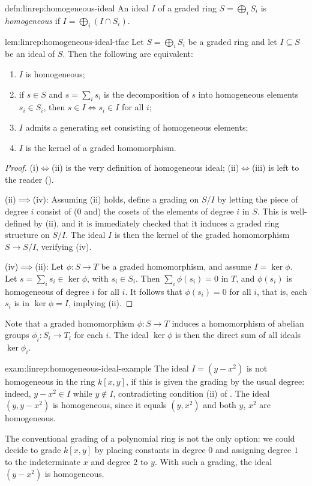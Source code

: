 \begin{defn}{}{defn:linrep:homogeneous-ideal}
  An ideal $I$ of a graded ring $S = \bigoplus_i S_i$ is
  \emph{homogeneous} if $I = \bigoplus_i (I \cap S_i)$.
\end{defn}
\begin{lem}{}{lem:linrep:homogeneous-ideal-tfae}
  Let $S = \bigoplus_i S_i$ be a graded ring and let $I \subseteq S$
  be an ideal of $S$. Then the following are equivalent:
  \begin{enumerate}[label=(\roman*)]
  \item $I$ is homogeneous;
  \item if $s \in S$ and $s = \sum_i s_i$ is the decomposition of $s$
    into homogeneous elements $s_i \in S_i$, then
    $s \in I \iff s_i \in I$ for all $i$;
  \item $I$ admits a generating set consisting of homogeneous
    elements;
  \item $I$ is the kernel of a graded homomorphism.
  \end{enumerate}
\end{lem}
\begin{proof}
  (i)$\iff$(ii) is the very definition of homogeneous ideal;
  (ii)$\iff$(iii) is left to the reader
  ().

  (ii)$\implies$(iv): Assuming (ii) holds, define a grading on $S/I$
  by letting the piece of degree $i$ consist of ($0$ and) the cosets
  of the elements of degree $i$ in $S$. This is well-defined by (ii),
  and it is immediately checked that it induces a graded ring
  structure on $S/I$. The ideal $I$ is then the kernel of the graded
  homomorphism $S \to S/I$, verifying (iv).

  (iv)$\implies$(ii): Let $\phi : S \to T$ be a graded homomorphism,
  and assume $I = \ker\phi$. Let $s = \sum_i s_i \in \ker\phi$, with
  $s_i \in S_i$. Then $\sum_i \phi(s_i) = 0$ in $T$, and $\phi(s_i)$
  is homogeneous of degree $i$ for all $i$. It follows that
  $\phi(s_i) = 0$ for all $i$, that is, each $s_i$ is in
  $\ker\phi = I$, implying (ii).
\end{proof}

Note that a graded homomorphism $\phi : S \to T$ induces a
homomorphism of abelian groups $\phi_i : S_i \to T_i$ for each $i$.
The ideal $\ker\phi$ is then the direct sum of all ideals
$\ker\phi_i$.
\begin{exam}{}{exam:linrep:homogeneous-ideal-example}
  The ideal $I = (y - x^2)$ is not homogeneous in the ring $k[x, y]$,
  if this is given the grading by the usual degree: indeed,
  $y - x^2 \in I$ while $y \notin I$, contradicting condition (ii) of
  . The ideal $(y, y - x^2)$ is homogeneous,
  since it equals $(y, x^2)$ and both $y$, $x^2$ are homogeneous.

  The conventional grading of a polynomial ring is not the only
  option: we could decide to grade $k[x, y]$ by placing constants in
  degree $0$ and assigning degree $1$ to the indeterminate $x$ and
  degree $2$ to $y$. With such a grading, the ideal $(y - x^2)$ is
  homogeneous.
\end{exam}

